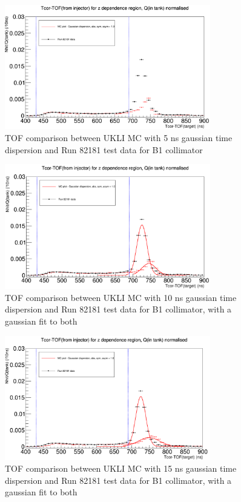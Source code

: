 \begin{figure}
    \centering
    \includegraphics[width=0.8\textwidth]{Figures/5ns_gaussian_dispersion_comparison.PNG}
    \caption{TOF comparison between UKLI MC with 5 ns gaussian time dispersion and Run 82181 test data for B1 collimator}
    \label{fig:5ns_time_dispersion}
\end{figure}

\begin{figure}
    \centering
    \includegraphics[width=0.8\textwidth]{Figures/10ns_gaussian_dispersion_with_fit.PNG}
    \caption{TOF comparison between UKLI MC with 10 ns gaussian time dispersion and Run 82181 test data for B1 collimator, with a gaussian fit to both}
    \label{fig:10ns_time_dispersion}
\end{figure}

\begin{figure}
    \centering
    \includegraphics[width=0.8\textwidth]{Figures/15ns_gaussian_dispersion_with_fit.PNG}
    \caption{TOF comparison between UKLI MC with 15 ns gaussian time dispersion and Run 82181 test data for B1 collimator, with a gaussian fit to both}
    \label{fig:15ns_time_dispersion}
\end{figure}

